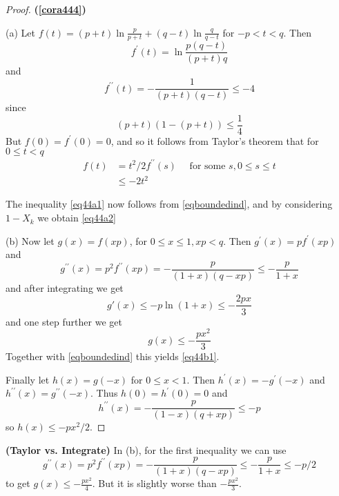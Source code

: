\documentclass{article}
\newcommand{\bfs}[1]{\textbf{({#1})}}
\begin{document}
\begin{proof}{\bfs{\cref{cora444}}}\label{proof:cora444}

(a) Let $f (t)=( p + t ) \ln \frac{ p }{ p + t }+( q - t ) \ln \frac{ q }{ q - t }$ for $- p < t < q$. Then
$$
f^{\prime}(t)=\ln \frac{p(q-t)}{(p+t) q}
$$
and
$$
f ^{\prime\prime}( t )=-\frac{1}{( p + t )( q - t )} \leq-4
$$
since
$$
(p+t)(1-(p+t)) \leq \frac{1}{4}
$$
But $f (0)= f ^{\prime}(0)=0$, and so it follows from Taylor's theorem that for $0 \leq t < q$
\begin{align*}
    f({t}) &=t^{2} / 2{f}^{\prime \prime}( {s}) \quad \text { for some }  {s}, 0 \leq  {s} \leq  {t} \\ & \leq-2  {t}^{2} 
\end{align*}

The inequality \cref{eq44a1} now follows from \cref{eqboundedind}, and by considering $1- X _{ k }$ we obtain \cref{eq44a2}

(b) Now let $g(x)=f(x p)$, for $0 \leq x \leq 1, x p<q$. Then $g^{\prime}(x)=p f^{\prime}(x p)$ and
$$
g^{\prime \prime}(x)=p^{2} f^{\prime \prime}(x p)=-\frac{p}{(1+x)(q-x p)}\leq- \frac{p}{1+x} 
$$
and after integrating we get
$$
g'(x) \leq-p \ln (1+x)\le -\frac{2px}{3}
$$
and one step further we get
$$
g(x) \leq -\frac{px^2}{3}
$$
Together with \cref{eqboundedind} this yields \cref{eq44b1}.



Finally let $h ( x )= g (- x )$ for $0 \leq x <1 .$ Then $h ^{\prime}( x )=- g ^{\prime}(- x )$ and
$h ^{\prime \prime}( x )= g ^{\prime \prime}(- x ) .$ Thus $h (0)= h ^{\prime}(0)=0$ and
$$
h^{\prime \prime}(x)=-\frac{p}{(1-x)(q+x p)} \leq-p
$$
so $h ( x ) \leq- px ^{2} / 2$.
\end{proof}
\begin{rema}{\bfs{Taylor vs. Integrate}}
In (b), for the first inequality we can use $$
g^{\prime \prime}(x)=p^{2} f^{\prime \prime}(x p)=-\frac{p}{(1+x)(q-x p)}\leq- \frac{p}{1+x} \le -p/2
$$
to get $ g(x) \leq -\frac{px^2}{4}$. But it is slightly worse than $ -\frac{px^2}{3}$. 
\end{rema}
\end{document}
